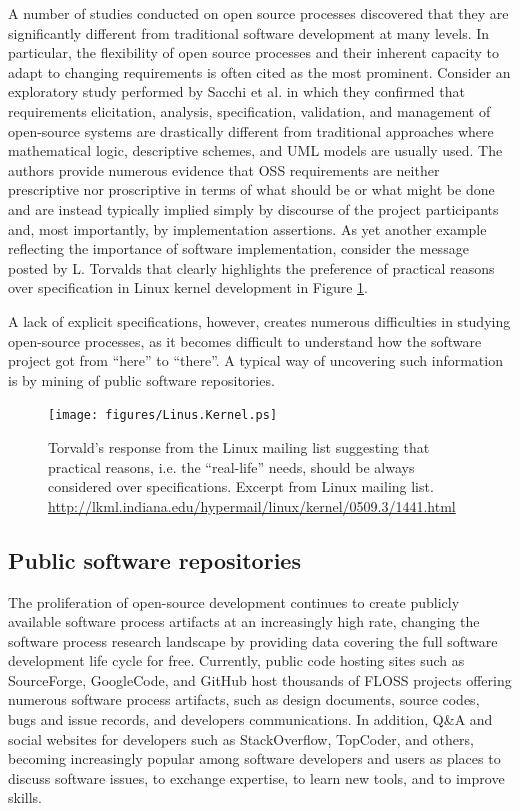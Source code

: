 A number of studies conducted on open source processes discovered that they are significantly 
different from traditional software development at many levels. In particular, the flexibility 
of open source processes and their inherent capacity to adapt to changing requirements is often 
cited as the most prominent. 
Consider an exploratory study performed by Sacchi et al. \cite{citeulike:342840} in which they 
confirmed that requirements elicitation, analysis, specification, validation, and management of 
open-source systems are drastically different from traditional approaches where mathematical 
logic, descriptive schemes, and UML models are usually used. 
The authors provide numerous evidence that OSS requirements are neither prescriptive nor 
proscriptive in terms of what should be or what might be done and are instead typically implied simply 
by discourse of the project participants and, most importantly, by implementation assertions.
As yet another example reflecting the importance of software implementation, consider the message 
posted by L. Torvalds that clearly highlights the preference of practical reasons over specification 
in Linux kernel development in Figure \ref{fig:kernel}.

A lack of explicit specifications, however, creates numerous difficulties in studying open-source processes, 
as it becomes difficult to understand how the software project got from ``here'' to ``there''. 
A typical way of uncovering such information is by mining of public software repositories.

\begin{figure}[ht!]
   \centering
   \texttt{[image: figures/Linus.Kernel.ps]}
   \caption[Torvald's response from the Linux mailing list suggesting that practical reasons, 
   i.e., the ``real-life'' needs, should be always considered over specifications.]{Torvald's response from the Linux mailing list suggesting that practical reasons, 
   i.e. the ``real-life'' needs, should be always considered over specifications.
   Excerpt from Linux mailing list. \url{http://lkml.indiana.edu/hypermail/linux/kernel/0509.3/1441.html}}
   \label{fig:kernel}
\end{figure}

\subsection{Public software repositories}
The proliferation of open-source development continues to create publicly available software process 
artifacts at an increasingly high rate, changing the software process research landscape by providing 
data covering the full software development life cycle for free. 
Currently, public code hosting sites such as SourceForge, GoogleCode, and GitHub host thousands of FLOSS 
projects offering numerous software process artifacts, such as design documents, source codes, bugs and 
issue records, and developers communications.
In addition, Q\&A and social websites for developers such as StackOverflow, TopCoder, and others, becoming 
increasingly popular among software developers and users as places to discuss software issues, 
to exchange expertise, to learn new tools, and to improve skills.

